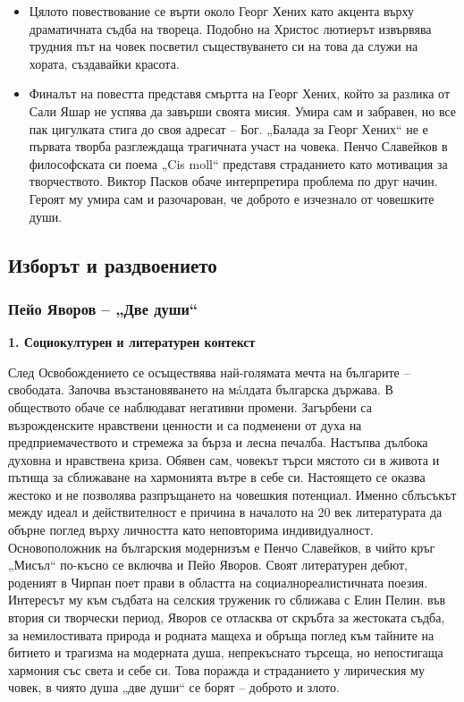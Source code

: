 \documentclass[12pt,a4paper]{article}
\begin{document}
\begin{itemize}[leftmargin=*, noitemsep, topsep=2pt, parsep=0pt]
    \vspace{0.1cm}
    \item Цялото повествование се върти около Георг Хених като акцента върху драматичната съдба на твореца. Подобно на Христос лютиерът извървява трудния път на човек посветил съществуването си на това да служи на хората, създавайки красота.
    \vspace{0.1cm}
    \item Финалът на повестта представя смъртта на Георг Хених, който за разлика от Сали Яшар не успява да завърши своята мисия. Умира сам и забравен, но все пак цигулката стига до своя адресат – Бог. „Балада за Георг Хених“ не е първата творба разглеждаща трагичната участ на човека. Пенчо Славейков в философската си поема „Cis moll“ представя страданието като мотивация за творчеството. Виктор Пасков обаче интерпретира проблема по друг начин. Героят му умира сам и разочарован, че доброто е изчезнало от човешките души.
\end{itemize}

\newpage

\subsection{Изборът и раздвоението}
\subsubsection{\colorbox{green!40}{Пейо Яворов – „Две души“}}
\vspace{0.1cm}
\textbf{1. Социокултурен и литературен контекст}
\vspace{0.1cm}

\indent След Освобождението се осъществява най-голямата мечта на българите – свободата. Започва възстановяването на мáлдата българска държава. В обществото обаче се наблюдават негативни промени. Загърбени са възрожденските нравствени ценности и са подменени от духа на предприемачеството и стремежа за бърза и лесна печалба. Настъпва дълбока духовна и нравствена криза. Обявен сам, човекът търси мястото си в живота и пътища за сближаване на хармонията вътре в себе си. Настоящето се оказва жестоко и не позволява разпръщането на човешкия потенциал. Именно сблъсъкът между идеал и действителност е причина в началото на 20 век литературата да обърне поглед върху личността като неповторима индивидуалност. Основоположник на българския модернизъм е Пенчо Славейков, в чийто кръг „Мисъл“ по-късно се включва и Пейо Яворов. Своят литературен дебют, роденият в Чирпан поет прави в областта на социалнореалистичната поезия. Интересът му към съдбата на селския труженик го сближава с Елин Пелин. във втория си творчески период, Яворов се отласква от скръбта за жестоката съдба, за немилостивата природа и родната мащеха и обръща поглед към тайните на битието и трагизма на модерната душа, непрекъснато търсеща, но непостигаща хармония със света и себе си. Това поражда и страданието у лирическия му човек, в чиято душа „две души“ се борят – доброто и злото.
\end{document}
